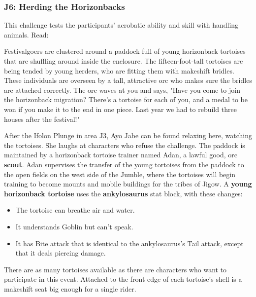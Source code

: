 \documentclass[10pt,a4,twoside,twocolumn,openany,nodeprecatedcode]{dndbook}
\begin{document}
\subsubsection{J6: Herding the Horizonbacks}
This challenge tests the participants' acrobatic ability and skill with handling animals. Read:
\begin{DndReadAloud}{}
Festivalgoers are clustered around a paddock full of young horizonback tortoises that are shuffling around inside the enclosure. The fifteen-foot-tall tortoises are being tended by young herders, who are fitting them with makeshift bridles. These individuals are overseen by a tall, attractive orc who makes sure the bridles are attached correctly.
The orc waves at you and says, "Have you come to join the horizonback migration? There's a tortoise for each of you, and a medal to be won if you make it to the end in one piece. Last year we had to rebuild three houses after the festival!"
\end{DndReadAloud}

After the Ifolon Plunge in area J3, Ayo Jabe can be found relaxing here, watching the tortoises. She laughs at characters who refuse the challenge.
The paddock is maintained by a horizonback tortoise trainer named Adan, a lawful good, orc \textbf{scout}. Adan supervises the transfer of the young tortoises from the paddock to the open fields on the west side of the Jumble, where the tortoises will begin training to become mounts and mobile buildings for the tribes of Jigow.
A \textbf{young horizonback tortoise} uses the \textbf{ankylosaurus} stat block, with these changes:
\begin{itemize}

\item The tortoise can breathe air and water.
\item It understands Goblin but can't speak.
\item It has Bite attack that is identical to the ankylosaurus's Tail attack, except that it deals piercing damage.
\end{itemize}


There are as many tortoises available as there are characters who want to participate in this event. Attached to the front edge of each tortoise's shell is a makeshift seat big enough for a single rider.
\end{document}
